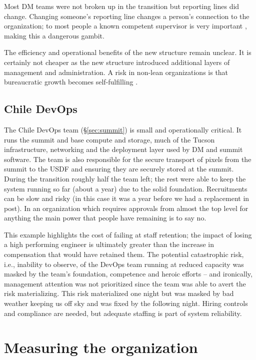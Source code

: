 Most DM teams were not broken up in the transition but reporting lines did change.
Changing someone's reporting line changes a person's connection to the organization;
to most people a known competent supervisor is very important \citep{bossfactor},
making this a dangerous gambit.

The efficiency and operational benefits of the new structure remain unclear.
It is certainly not cheaper as the new structure introduced additional layers of management and administration.
A risk in non-lean organizations is that bureaucratic growth becomes self-fulfilling \citep{Parkinson1955}.

\subsection{Chile DevOps}
\label{sec:devops}

The Chile DevOps team (\S\ref{sec:summit}) is small and operationally critical.
It runs the summit and base compute and storage, much of the Tucson infrastructure, networking and the deployment layer used by DM and summit software. The team is also responsible for the secure transport of pixels from the summit to the USDF and ensuring they are securely stored at the summit.
During the transition roughly half the team left; the rest were able to keep the system running so far (about a year) due to the
solid foundation.
Recruitments can be slow and risky (in this case it was a year before we had a replacement in post).
In an organization which requires approvals from almost the top level for anything the main power that people have remaining is to say no.

This example highlights the cost of failing at staff retention; the impact of losing a high performing engineer is ultimately greater than the increase in compensation that would have retained them.
The potential catastrophic risk, i.e., inability to observe, of the DevOps team running at reduced capacity was masked by the team's foundation, competence and heroic efforts -- and ironically, management attention was not prioritized since the team was able to avert the risk materializing.
This risk materialized one night but was masked by bad weather keeping us off sky and was fixed by the following night.
Hiring controls and compliance are needed, but adequate staffing is part of system reliability.


\section{Measuring the organization}
\label{sec:metrics}

